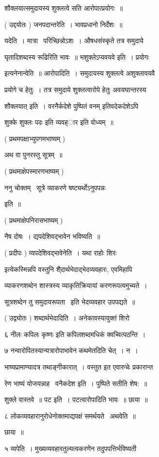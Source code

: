 \documentclass[11pt, openany]{book}
\begin{document}
शौक्लयात्समुदायस्य शुक्लत्वे सति आरोपात्प्रयोगः~॥ 

( उद्दयोतः ) जनपदान्तरेति~। भावप्रधानो निर्देशः~॥ 

यदेति~। मात्रा \textendash\ परिच्छिन्नोऽशः~। औषधसंस्कृते तत्र समुदाये 

घृतादिशब्दस्य रूढिरिति भावः~॥ भशुक्लेऽप्यवयवे इति~। {\qt प्रयोगः} 

इत्यनेनान्वेति~॥ आरोपादिति~। समुदायस्य शुक्लत्वे अशुक्लावयवै 

प्रयोगे च हेतुः~। तत्र समुदाये शुक्लत्वारोपे हेतुः अवयघान्तरस्य 

{\qt शौक्लयात्} इति~। वरनैर्कदेशे {\qt पुष्पितं वनम्} इतिवदेकदेशेऽपि 

शुक्के शुक्लः पदः इति व्यवह्ार इति वोध्यम्~॥ 

( प्रथमपक्षाभ्युपगमभाष्यम् ) 

अथ वा पुनरस्तु सूत्रम्~॥ 

( प्रथमाक्षेपस्मारणभाष्यम् ) 

ननु चोक्तम् \textendash\ सूत्रे व्याकरणे षष्ट्यर्थोऽनुपपन्नः 

इति~॥ 

( प्रथमाक्षेपनिरासभाष्यम् ) 

नैष दोषः~। द्यपदेशिवद्भावेन भविष्यति~॥ 

( प्रदीपः ) व्यपदेशिवद्भावेनेति~। यथा {\qt राहोः शिरः} 

इत्येकस्मिन्नपि वस्तुनि शै्दार्थभेदाद्भेदव्यवहारः, एवमिहापि 

व्याकरणशब्देन शास्त्रस्य व्याकृतिक्रियायां करणरूपत्वमुच्यते~। 

सूत्रशब्देन तु समुदायरूपता \textendash\ इति भेदव्यवहार उपपद्यते~॥ 

( उद्व्योतः ) शब्दार्थभेदादिति~। अनेकावस्यायुक्तं शिरो 



६ {\qt नीलः कपिलः कृष्णः इति कपिलशब्दमधिकं क्वच्वित्पठन्ति~।}

७ नन्वारोपितस्यान्यत्रारोपाभावेन कथमेतदिति चेत्~। न~। 

भाष्यप्रामाण्यादत्र तथाङ्गीकारात्~। वस्तुत इत एवारुचेः प्रकारान्त \textendash\ 

रेण भाष्यं योजयन्नाह \textendash\ वनैकदेश इति~। पुष्पिते सतीति शेष:~॥ 

शुक्ले वास्तवे~॥ पट इति~। पटत्वारोपादिति भावः~॥ छाया~॥ 

८ लोकव्यवहारानुरोधेनोक्तमाद्यपक्षं समर्थयते \textendash\ अथवेति~॥ 

छाया~॥ 

५ व्यपेति~। मुख्यव्यवहारतुल्यत्वकरणेन तदुपपत्तिर्भविष्यती \textendash\ 
\end{document}
